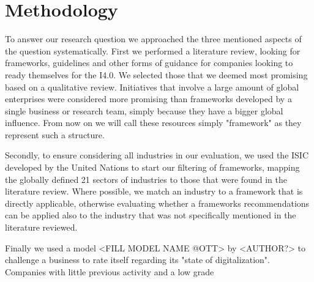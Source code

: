 \section{Methodology}

To answer our research question we approached the three mentioned aspects of the question systematically. First we performed a literature review, looking for frameworks, guidelines and other forms of guidance for companies looking to ready themselves for the \ac{I4.0}. We selected those that we deemed most promising based on a qualitative review. Initiatives that involve a large amount of global enterprises were considered more promising than frameworks developed by a single business or research team, simply because they have a bigger global influence. From now on we will call these resources simply "framework" as they represent such a structure.

Secondly, to ensure considering all industries in our evaluation, we used the \ac{ISIC} developed by the United Nations to start our filtering of frameworks, mapping the globally defined 21 sectors of industries \cite{ISIC:2008} to those that were found in the literature review. Where possible, we match an industry to a framework that is directly applicable, otherwise evaluating whether a frameworks recommendations can be applied also to the industry that was not specifically mentioned in the literature reviewed. 

Finally we used a model <FILL MODEL NAME @OTT> by <AUTHOR?> to challenge a business to rate itself regarding its "state of digitalization". Companies with little previous activity and a low grade
